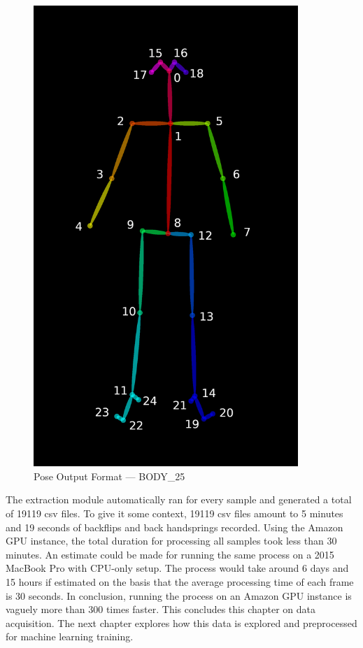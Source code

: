 \begin{figure}
    \centering
    \includegraphics[width=10cm]{images/data-acquisition/keypoints-pose-25.png}
    \caption{Pose Output Format --- BODY\_25}
    \label{pose-output-format}
\end{figure}


The extraction module automatically ran for every sample and generated a total of 19119 csv files. To give it some context, 19119 csv files amount to 5 minutes and 19 seconds of backflips and back handsprings recorded. Using the Amazon GPU instance, the total duration for processing all samples took less than 30 minutes. An estimate could be made for running the same process on a 2015 MacBook Pro with CPU-only setup. The process would take around 6 days and 15 hours if estimated on the basis that the average processing time of each frame is 30 seconds. In conclusion, running the process on an Amazon GPU instance is vaguely more than 300 times faster. This concludes this chapter on data acquisition. The next chapter explores how this data is explored and preprocessed for machine learning training.




















